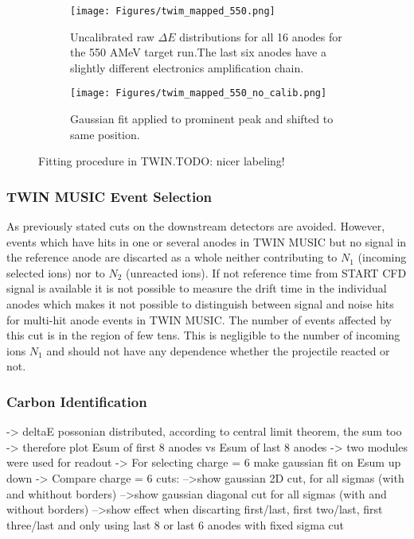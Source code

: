 \begin{figure}
     \centering
     \begin{subfigure}[t]{0.45\textwidth}
         \centering
         \texttt{[image: Figures/twim\_mapped\_550.png]}
         \caption{Uncalibrated raw $\Delta E$ distributions for all 16 anodes for the 550 AMeV target run.The last six anodes have a slightly different electronics amplification chain.}
         \label{fig:raw_twim}
     \end{subfigure}
     \hfill
     \begin{subfigure}[t]{0.45\textwidth}
         \centering
         \texttt{[image: Figures/twim\_mapped\_550\_no\_calib.png]}
         \caption{Gaussian fit applied to prominent peak and shifted to same position.}
         \label{fig:cal_twim_one}
     \end{subfigure}
     \hfill
        \caption{Fitting procedure in TWIN.TODO: nicer labeling!}
        \label{fig:calibration}
\end{figure}
\subsubsection{TWIN MUSIC Event Selection}
As previously stated cuts on the downstream detectors are avoided. However, events which have hits in one or several anodes in TWIN MUSIC but no signal in the reference anode are discarted as a whole neither contributing to $N_1$ (incoming selected ions) nor to $N_2$ (unreacted ions). If not reference time from START CFD signal is available it is not possible to measure the drift time in the individual anodes which makes it not possible to distinguish between signal and noise hits for multi-hit anode events in TWIN MUSIC. The number of events affected by this cut is in the region of few tens. This is negligible to the number of incoming ions $N_1$ and should not have any dependence whether the projectile reacted or not. 
\subsubsection{Carbon Identification}
-> deltaE possonian distributed, according to central limit theorem, the sum too
-> therefore plot Esum of first 8 anodes vs Esum of last 8 anodes
-> two modules were used for readout
-> For selecting charge = 6 make gaussian fit on Esum up down
-> Compare charge = 6 cuts:
	-->show gaussian 2D cut, for all sigmas (with and whithout borders)
	-->show gaussian diagonal cut for all sigmas (with and without borders)
	-->show effect when discarting first/last, first two/last, first three/last and only using last 8 or last 6 anodes with fixed sigma cut
	


